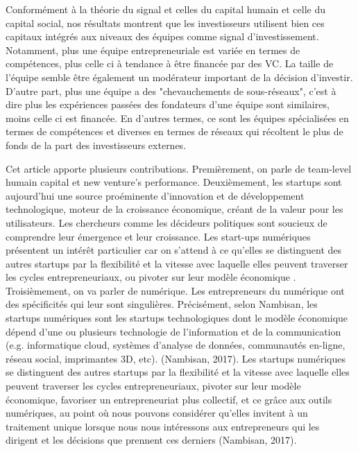 \documentclass[12pt]{article}
\begin{document}
Conformément à la théorie du signal et celles du capital humain et celle du capital social, nos résultats montrent que les investisseurs utilisent bien ces capitaux intégrés aux niveaux des équipes comme signal d'investissement. Notamment, plus une équipe entrepreneuriale est variée en termes de compétences, plus celle ci à tendance à être financée par des VC. La taille de l'équipe semble être également un modérateur important de la décision d'investir. D'autre part, plus une équipe a des "chevauchements de sous-réseaux", c'est à dire plus les expériences passées des fondateurs d'une équipe sont similaires, moins celle ci est financée. En d'autres termes, ce sont les équipes spécialisées en termes de compétences et diverses en termes de réseaux qui récoltent le plus de fonds de la part des investisseurs externes.

Cet article apporte plusieurs contributions. Premièrement, on parle de team-level humain capital et new venture's performance. Deuxièmement, les startups sont aujourd'hui une source proéminente d'innovation et de développement technologique, moteur de la croissance économique, créant de la valeur pour les utilisateurs. Les chercheurs comme les décideurs politiques sont soucieux de comprendre leur émergence et leur croissance. Les start-ups numériques présentent un intérêt particulier car on s'attend à ce qu'elles se distinguent des autres startups par la flexibilité et la vitesse avec laquelle elles peuvent traverser les cycles entrepreneuriaux, ou pivoter sur leur modèle économique \citep{nambisan2017digital}. Troisièmement, on va parler de numérique. Les entrepreneurs du numérique ont des spécificités qui leur sont singulières. Précisément, selon Nambisan, les startups numériques sont les startups technologiques dont le modèle économique dépend d’une ou plusieurs technologie de l’information et de la communication (e.g. informatique cloud, systèmes d’analyse de données, communautés en-ligne, réseau social, imprimantes 3D, etc). (Nambisan, 2017). Les startups numériques se distinguent des autres startups par la flexibilité et la vitesse avec laquelle elles peuvent traverser les cycles entrepreneuriaux, pivoter sur leur modèle économique, favoriser un entrepreneuriat plus collectif, et ce grâce aux outils numériques, au point où nous pouvons considérer qu’elles invitent à un traitement unique lorsque nous nous intéressons aux entrepreneurs qui les dirigent et les décisions que prennent ces derniers (Nambisan, 2017).
\end{document}
